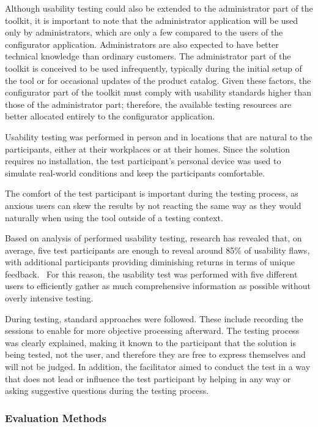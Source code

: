 Although usability testing could also be extended to the administrator part of the toolkit, it is important to note that the administrator application will be used only by administrators, which are only a few compared to the users of the configurator application. Administrators are also expected to have better technical knowledge than ordinary customers. The administrator part of the toolkit is conceived to be used infrequently, typically during the initial setup of the tool or for occasional updates of the product catalog. Given these factors, the configurator part of the toolkit must comply with usability standards higher than those of the administrator part; therefore, the available testing resources are better allocated entirely to the configurator application.

Usability testing was performed in person and in locations that are natural to the participants, either at their workplaces or at their homes. Since the solution requires no installation, the test participant's personal device was used to simulate real-world conditions and keep the participants comfortable.

The comfort of the test participant is important during the testing process, as anxious users can skew the results by not reacting the same way as they would naturally when using the tool outside of a testing context.~\cite{Nielsen1994}

Based on analysis of performed usability testing, research has revealed that, on average, five test participants are enough to reveal around 85\% of usability flaws, with additional participants providing diminishing returns in terms of unique feedback.~\cite{Nielsen2000} For this reason, the usability test was performed with five different users to efficiently gather as much comprehensive information as possible without overly intensive testing.  

During testing, standard approaches were followed. These include recording the sessions to enable for more objective processing afterward. The testing process was clearly explained, making it known to the participant that the solution is being tested, not the user, and therefore they are free to express themselves and will not be judged. In addition, the facilitator aimed to conduct the test in a way that does not lead or influence the test participant by helping in any way or asking suggestive questions during the testing process.~\cite{Moran2019}

\subsubsection{Evaluation Methods}

